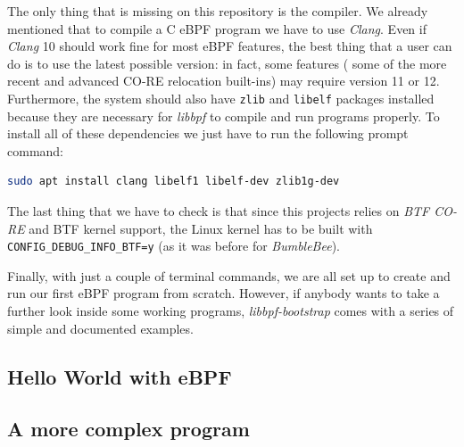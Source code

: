 The only thing that is missing on this repository is the compiler.
We already mentioned that to compile a C eBPF program we have to use \textit{Clang}.
Even if \textit{Clang} 10 should work fine for most eBPF features, the best thing that a user can do is to use the latest possible version: in fact, some features ( some of the more recent and advanced CO-RE relocation built-ins) may require version 11 or 12.
Furthermore, the system should also have \verb|zlib| and \verb|libelf| packages installed because they are necessary for \textit{libbpf} to compile and run programs properly.
To install all of these dependencies we just have to run the following prompt command:

\begin{lstlisting}[language=bash, caption={libbpf-bootstrap clone command}]
	sudo apt install clang libelf1 libelf-dev zlib1g-dev
\end{lstlisting}

The last thing that we have to check is that since this projects relies on \textit{BTF CO-RE} and BTF kernel support, the  Linux kernel has to be built with \verb|CONFIG_DEBUG_INFO_BTF=y| (as it was before for \textit{BumbleBee}).

Finally, with just a couple of terminal commands, we are all set up to create and run our first eBPF program from scratch.
However, if anybody wants to take a further look inside some working programs, \textit{libbpf-bootstrap} comes with a series of simple and documented examples.

\subsection{Hello World with eBPF}

\subsection{A more complex program}
